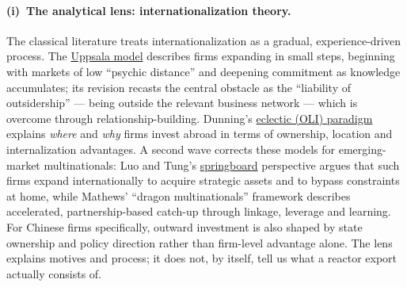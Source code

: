 \documentclass[11pt]{article}
\newcommand{\jl}[2]{\href{#2}{#1}}
\begin{document}
\paragraph{(i)~The analytical lens: internationalization theory.}
The classical literature treats internationalization as a gradual, experience-driven process. The \jl{Uppsala model}{https://en.wikipedia.org/wiki/Uppsala_model} describes firms expanding in small steps, beginning with markets of low ``psychic distance'' and deepening commitment as knowledge accumulates; its revision recasts the central obstacle as the ``liability of outsidership'' --- being outside the relevant business network --- which is overcome through relationship-building.\cite{johanson_vahlne2009} Dunning's \jl{eclectic (OLI) paradigm}{https://en.wikipedia.org/wiki/Eclectic_paradigm} explains \emph{where} and \emph{why} firms invest abroad in terms of ownership, location and internalization advantages.\cite{dunning2000} A second wave corrects these models for emerging-market multinationals: Luo and Tung's \jl{springboard}{https://en.wikipedia.org/wiki/Springboard_Theory} perspective argues that such firms expand internationally to acquire strategic assets and to bypass constraints at home,\cite{luo_tung2007} while Mathews' ``dragon multinationals'' framework describes accelerated, partnership-based catch-up through linkage, leverage and learning.\cite{mathews2006} For Chinese firms specifically, outward investment is also shaped by state ownership and policy direction rather than firm-level advantage alone.\cite{buckley2007} The lens explains motives and process; it does not, by itself, tell us what a reactor export actually consists of.
\end{document}

